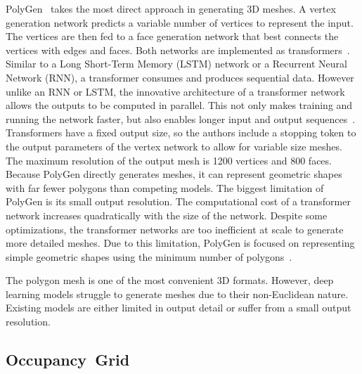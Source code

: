 \newpage

PolyGen~\cite{Nash2020} takes the most direct approach in generating 3D meshes. A vertex generation network predicts a variable number of vertices to represent the input. The vertices are then fed to a face generation network that best connects the vertices with edges and faces. Both networks are implemented as transformers~\cite{Nash2020}. Similar to a Long Short-Term Memory (LSTM) network or a Recurrent Neural Network (RNN), a transformer consumes and produces sequential data. However unlike  an RNN or LSTM, the innovative architecture of a transformer network allows the outputs to be computed in parallel. This not only makes training and running the network faster, but also enables longer input and output sequences~\cite{Vaswani2017}. Transformers have a fixed output size, so the authors include a stopping token to the output parameters of the vertex network to allow for variable size meshes. The maximum resolution of the output mesh is 1200 vertices and 800 faces. Because PolyGen directly generates meshes, it can represent geometric shapes with far fewer polygons than competing models. The biggest limitation of PolyGen is its small output resolution. The computational cost of a transformer network increases quadratically with the size of the network. Despite some optimizations, the transformer networks are too inefficient at scale to generate more detailed meshes. Due to this limitation, PolyGen is focused on representing simple geometric shapes using the minimum number of polygons~\cite{Nash2020}.

The polygon mesh is one of the most convenient 3D formats. However, deep learning models struggle to generate meshes due to their non-Euclidean nature. Existing models are either limited in output detail or suffer from a small output resolution.

\newpage


\subsection{Occupancy~Grid}
\label{subsec:occupancy_grid}

